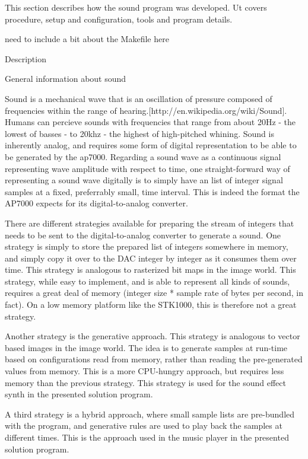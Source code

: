 
This section describes how the sound program was developed. Ut covers procedure, setup and configuration, tools and program details.



need to include a bit about the Makefile here


Description

General information about sound

Sound is a mechanical wave that is an oscillation of pressure composed of frequencies within the range of hearing.[http://en.wikipedia.org/wiki/Sound].
Humans can percieve sounds with frequencies that range from about 20Hz - the lowest of basses - to 20khz - the highest of high-pitched whining.
Sound is inherently analog, and requires some form of digital representation to be able to be generated by the ap7000.
Regarding a sound wave as a continuous signal representing wave amplitude with respect to time, one straight-forward way of representing a sound wave digitally is to simply have an list of integer signal samples at a fixed, preferrably small, time interval.
This is indeed the format the AP7000 expects for its digital-to-analog converter.

There are different strategies available for preparing the stream of integers that needs to be sent to the digital-to-analog converter to generate a sound.
One strategy is simply to store the prepared list of integers somewhere in memory, and simply copy it over to the DAC integer by integer as it consumes them over time.
This strategy is analogous to rasterized bit maps in the image world.
This strategy, while easy to implement, and is able to represent all kinds of sounds, requires a great deal of memory (integer size * sample rate of bytes per second, in fact).
On a low memory platform like the STK1000, this is therefore not a great strategy.

Another strategy is the generative approach.
This strategy is analogous to vector based images in the image world.
The idea is to generate samples at run-time based on configurations read from memory, rather than reading the pre-generated values from memory.
This is a more CPU-hungry approach, but requires less memory than the previous strategy.
This strategy is used for the sound effect synth in the presented solution program.

A third strategy is a hybrid approach, where small sample lists are pre-bundled with the program, and generative rules are used to play back the samples at different times.
This is the approach used in the music player in the presented solution program.


